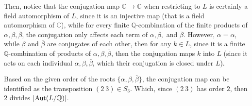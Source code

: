 \documentclass{article}
\begin{document}
\hfil

Then, notice that the conjugation map $\mathbb{C}\rightarrow\mathbb{C}$ when restricting to $L$ is certainly a field automorphism of $L$, since it is an injective map (that is a field automorphism of $\mathbb{C}$), while for every finite $\mathbb{Q}$-combination of the finite products of $\alpha,\beta,\overline{\beta}$, the conjugation only affects each term of $\alpha,\beta,$ and $\overline{\beta}$. However, $\overline{\alpha}=\alpha$, while $\beta$ and $\overline{\beta}$ are conjugates of each other, then for any $k\in L$, since it is a finite $\mathbb{Q}$-combination of products of $\alpha,\beta,\overline{\beta}$, then the conjugation maps $k$ into $L$ (since it acts on each individual $\alpha,\beta,\overline{\beta}$, which their conjugation is closed under $L$).

Based on the given order of the roots $\{\alpha,\beta,\overline{\beta}\}$, the conjugation map can be identified as the transposition $(2\ 3)\in S_3$. Which, since $(2\ 3)$ has order $2$, then $2$ divides $|\textmd{Aut}(L/\mathbb{Q})|$.
\end{document}
